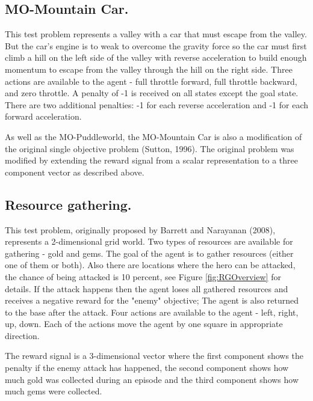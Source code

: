 {{\subsection{MO-Mountain Car.}
This test problem represents a valley with a car that must escape from the valley. But the car's engine is to weak to overcome the gravity force so the car must first climb a hill on the left side of the valley with reverse acceleration to build enough momentum to escape from the valley through the hill on the right side. Three actions are available to the agent - full throttle forward, full throttle backward, and zero throttle. A penalty of -1 is received on all states except the goal state. There are two additional penalties: -1 for each reverse acceleration and -1 for each forward acceleration.

As well as the MO-Puddleworld, the MO-Mountain Car is also a modification of the original single objective problem (Sutton, 1996\nocite{sutton1996generalization}). The original problem was modified by extending the reward signal from a scalar representation to a three component vector as described above.

\subsection{Resource gathering.}
\label{sec:resource-gathering}
This test problem, originally proposed by Barrett and Narayanan (2008)\nocite{barrett2008learning}, represents a 2-dimensional grid world. Two types of resources are available for gathering - gold and gems. The goal of the agent is to gather resources (either one of them or both). Also there are locations where the hero can be attacked, the chance of being attacked is 10 percent, see Figure \ref{fig:RGOverview} for details. If the attack happens then the agent loses all gathered resources and receives a negative reward for the "enemy" objective; The agent is also returned to the base after the attack. Four actions are available to the agent - left, right, up, down. Each of the actions move the agent by one square in appropriate direction.

The reward signal is a 3-dimensional vector where the first component shows the penalty if the enemy attack has happened, the second component shows how much gold was collected during an episode and the third component shows how much gems were collected.

}}
